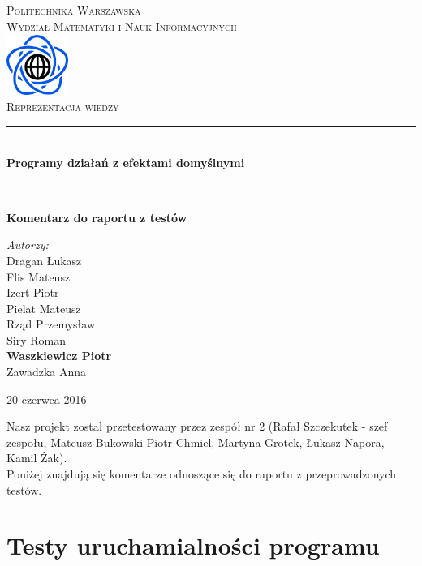 \documentclass{article}
\begin{document}
\begin{titlepage}
\newcommand{\HRule}{\rule{\linewidth}{0.5mm}}
\newcommand{\Action}[1]{\textsc{#1}}
\center
\textsc{\LARGE Politechnika Warszawska}\\[0.3cm]
\textsc{\Large Wydział Matematyki i Nauk Informacyjnych}\\[0.6cm]
\includegraphics[width=2cm, height=2cm]{logo}\\[0.6cm]
\textsc{\Huge Reprezentacja wiedzy}\\[0.3cm]
\HRule \\[0.4cm]
{ \LARGE \bfseries Programy działań z efektami domyślnymi}\\[0.1cm]
 
\HRule \\[0.4cm]
{  \bfseries Komentarz do raportu z testów}\\[1.2cm]
\begin{flushright}
\Large \emph{Autorzy:}\\[0.5cm]
Dragan Łukasz\\
Flis Mateusz\\
Izert Piotr\\
Pielat Mateusz\\
Rząd Przemysław\\
Siry Roman\\
\textbf{Waszkiewicz Piotr}\\
Zawadzka Anna\\[0.9cm]
\end{flushright}
\vfill
{\large 20 czerwca 2016}\\[1cm]
\end{titlepage}
\newpage


Nasz projekt został przetestowany przez zespół nr 2 (Rafał Szczekutek - szef zespołu, Mateusz Bukowski  Piotr Chmiel, Martyna Grotek, Łukasz Napora, Kamil Żak). \\
Poniżej znajdują się komentarze odnoszące się do raportu z przeprowadzonych testów.
\section{Testy uruchamialności programu}
\end{document}
